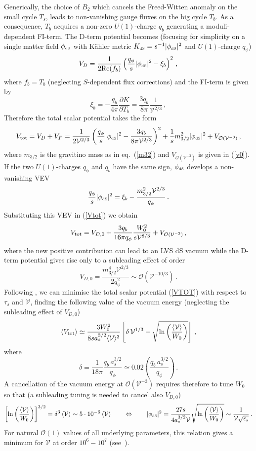 \documentclass[11pt,a4paper]{article}
\newcommand{\be}{\begin{equation}}
\newcommand{\ee}{\end{equation}}
\def\dS{{\scriptscriptstyle \rm dS}}
\newcommand\vo{{\mathcal{V}}}
\newcommand{\mc}{\mathcal}
\begin{document}
Generically, the choice of $B_2$ which cancels the Freed-Witten anomaly on the small cycle $T_s$,
leads to non-vanishing gauge fluxes on the big cycle $T_b$. As a consequence, $T_b$ acquires a non-zero $U(1)$-charge $q_b$
generating a moduli-dependent FI-term. The D-term potential becomes
(focusing for simplicity on a single matter field $\phi_\dS$ with K\"ahler metric $K_\dS= s^{-1}|\phi_\dS|^2$ \cite{Conlon:2006tj, Aparicio:2008wh} and $U(1)$-charge $q_\phi$)
\be
\label{dmatter}
V_D = \frac{1}{2{\rm Re}(f_b)} \left(\frac{q_\phi}{s} |\phi_\dS|^2 - \xi_b\right)^2\,,
\ee
where $f_b = T_b$ (neglecting $S$-dependent flux corrections) and the FI-term is given by
\be
\xi_b = - \frac{q_b}{4\pi} \frac{\partial K}{\partial T_b} = \frac{3 q_b}{8\pi}\frac{1}{\vo^{2/3}}\,,
\ee
Therefore the total scalar potential takes the form
\be
V_{\rm tot} = V_D + V_F =  \frac{1}{2\vo^{2/3}} \left(\frac{q_\phi}{s}  |\phi_\dS|^2 - \frac{3 q_b}{8\pi\vo^{2/3}}\right)^2
+ \frac{1}{s} m_{3/2}^2 |\phi_\dS|^2 + V_{\mc{O}(\vo^{-3})}\,,
\label{Vtot}
\ee
where $m_{3/2}$ is the gravitino mass as in eq.~(\ref{m32}) and $V_{\mc{O}(\vo^{-3})}$ is given in (\ref{v0}).
If the two $U(1)$-charges $q_\phi$ and $q_b$ have the same sign,
$\phi_\dS$ develops a non-vanishing VEV
\be
\label{minphi}
\frac{q_\phi}{s} |\phi_\dS|^2 = \xi_b - \frac{m_{3/2}^2 \vo^{2/3}}{q_\phi}\,.
\ee
Substituting this VEV in (\ref{Vtot}) we obtain
\be
V_{\rm tot} = V_{D,0}+\frac{3 q_b}{16\pi q_\phi} \frac{W_0^2}{s  \vo^{8/3}}+V_{\mc{O}(\vo^{-3})}\,,
\label{VTOT}
\ee
where the new positive contribution can lead to an LVS dS vacuum
while the D-term potential gives rise only to a subleading effect of order
\be
V_{D,0} = \frac{m_{3/2}^4 \vo^{2/3}}{2 q_\phi^2}\sim \mc{O}\left(\vo^{-10/3}\right)\,.
\label{VD0ds1}
\ee
Following \cite{Cicoli:2012vw}, we can minimise the total scalar potential (\ref{VTOT}) with respect to $\tau_s$ and $\vo$,
finding the following value of the vacuum energy (neglecting the subleading effect of $V_{D,0}$)
\be
\langle V_{\rm tot} \rangle \simeq \frac{3 W_0^2}{8s a_s^{3/2}\langle\vo\rangle^3}\left[\delta\, \vo^{1/3}
-\sqrt{\ln\left(\frac{\langle\vo\rangle}{W_0}\right)}\right]\,,
\label{VTOTfin}
\ee
where
\be
\delta = \frac{1}{18\pi}\frac{q_b\,a_s^{3/2}}{q_\phi} \simeq 0.02 \left(\frac{q_b\,a_s^{3/2}}{q_\phi}\right)\,.
\ee
A cancellation of the vacuum energy at $\mc{O}(\vo^{-3})$ requires therefore to tune $W_0$ so that
(a subleading tuning is needed to cancel also $V_{D,0}$)
\be
\left[\ln\left(\frac{\langle\vo\rangle}{W_0}\right)\right]^{3/2}= \delta^3\, \langle\vo\rangle \sim 5\cdot 10^{-6}\, \langle\vo\rangle\qquad\Leftrightarrow\qquad
|\phi_\dS|^2 = \frac{27 s}{4 a_s^{3/2}\vo}\sqrt{\ln\left(\frac{\langle\vo\rangle}{W_0}\right)}\sim \frac{1}{\vo\sqrt{\epsilon_s}}\,.
\label{CCconddS1}
\ee
For natural $\mc{O}(1)$ values of all underlying parameters, this relation gives a minimum for $\vo$ at order $10^6 - 10^7$ (see~\cite{Cicoli:2012vw}).
\end{document}
